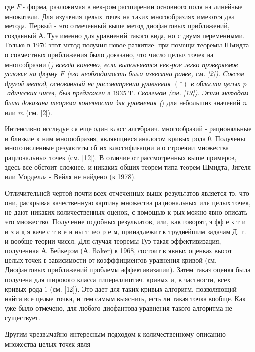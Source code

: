 \documentclass[10pt]{article}
\begin{document}
где $F$ - форма, разложимая в нек-ром расширении основного поля на линейные множители. Для изучения целых точек на таких многообразиях имеются два метода. Первый - это отмеченный выше метод диофантовых приближений, созданный А. Туэ именно для уравнений такого вида, но с двумя переменными. Только в 1970 этот метод получил новое развитие: при помощи теоремы Шмидта о совместных приближения было доказано, что число целых точек на многообразии (\textit{) всегда конечно, если выполняется нек-рое легко проверяемое условие на форму $F$ (его необходимость была известна ранее, см. [2]). Совсем другой метод, основанный на рассмотрении уравнения $(*)$ в области целых $p$-адических чисел, был предложен в $1935 \mathrm{~T}$. Сколемом (см. [13]). Этим методом была доказана теорема конечности для уравнения (}) для небольших значений $n$ или $m$ (см. [2]).



Интенсивно исследуется еще один класс алгебраич. многообразий - рациональные и близкие к ним многообразия, являющиеся аналогом кривых рода 0. Получены многочисленные результаты об их классификации и о строении множества рациональных точек (см. [12]). В отличие от рассмотренных выше примеров, здесь все обстоит сложнее, и никаких общих теорем типа теорем Шмидта, Зигеля или Морделла - Вейля не найдено (к 1978).



Отличительной чертой почти всех отмеченных выше результатов является то, что они, раскрывая качественную картину множества рациональных или целых точек, не дают никаких количественных оценок, с помощью к-рых можно явно описать это множество. Получение подобных результатов, или, как говорят, э фф е к т и и з а ц я каче с т в е н ны т тео р е м, принадлежит к труднейшим задачам Д. г. и вообще теории чисел. Для случая теоремы Туэ такая эффективизация, полученная А. Бейкером (А. Baker) в 1968, состоит в явных оценках высот целых точек в зависимости от коэфффициентов уравнения кривой (см. Диофантовых приближений проблемы әффективизации). Затем такая оценка была получена для широкого класса гиперәллиптич. кривых и, в частности, всех кривых рода 1 (см. [12]). Это дает для таких кривых алгоритм, позволяющий найти все целые точки, и тем самым выяснить, есть ли такая точка вообще. Как уже было отмечено, для любого диофантова уравнения такого алгоритма не существует.



Другим чрезвычайно интересным подходом к количественному описанию множества целых точек явля-
\end{document}
